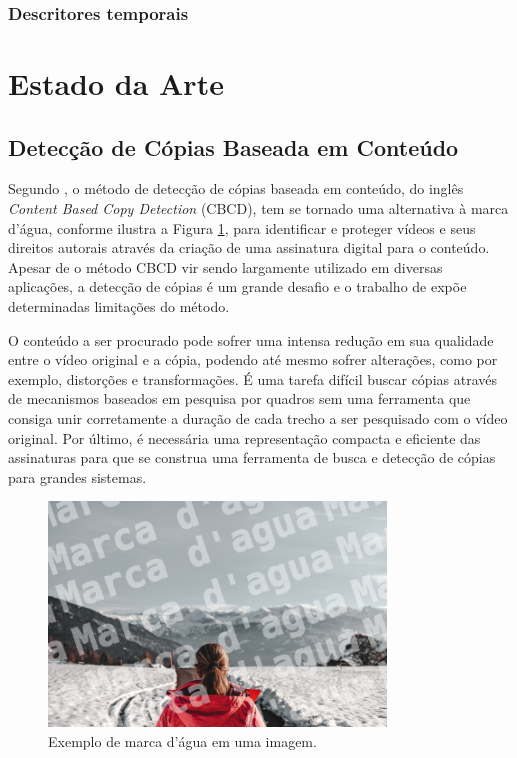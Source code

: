 \subsubsection{Descritores temporais}
\label{Descritores espaciais}



\section{Estado da Arte}
\label{sec:estadodaarte}

     \subsection{Detecção de Cópias Baseada em Conteúdo} 
	Segundo \citeauthor{jiang2011pku}, o método de detecção de cópias baseada em conteúdo, do inglês \textit{Content Based Copy Detection} (CBCD), tem se tornado uma alternativa à marca d'água, conforme ilustra a Figura \ref{fig:marcadagua}, para identificar e proteger vídeos e seus direitos autorais através da criação de uma assinatura digital para o conteúdo. Apesar de o método CBCD vir sendo largamente utilizado em diversas aplicações, a detecção de cópias é um grande desafio e o trabalho de \citeauthor{jiang2011pku} expõe determinadas limitações do método.
    
    O conteúdo a ser procurado pode sofrer uma intensa redução em sua qualidade entre o vídeo original e a cópia, podendo até mesmo sofrer alterações, como por exemplo, distorções e transformações. É uma tarefa difícil buscar cópias através de mecanismos baseados em pesquisa por quadros sem uma ferramenta que consiga unir corretamente a duração de cada trecho a ser pesquisado com o vídeo original. Por último, é necessária uma representação compacta e eficiente das assinaturas para que se construa uma ferramenta de busca e detecção de cópias para grandes sistemas.
    
    	\begin{figure}[h]
        \centering
        \includegraphics[width=0.8\textwidth]{dados/figuras/marca_dagua.png}
        \caption{Exemplo de marca d'água em uma imagem.}
    	\label{fig:marcadagua}
    \end{figure}

